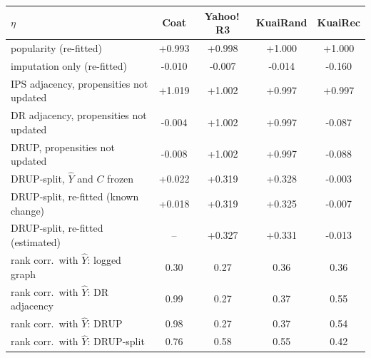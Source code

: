 \begin{tabular}{lcccc}
\toprule
$\eta$ & Coat & Yahoo!\,R3 & KuaiRand & KuaiRec\\
\midrule
popularity (re-fitted) & +0.993 & +0.998 & +1.000 & +1.000\\
imputation only (re-fitted) & -0.010 & -0.007 & -0.014 & -0.160\\
IPS adjacency, propensities not updated & +1.019 & +1.002 & +0.997 & +0.997\\
DR adjacency, propensities not updated & -0.004 & +1.002 & +0.997 & -0.087\\
DRUP, propensities not updated & -0.008 & +1.002 & +0.997 & -0.088\\
DRUP-split, $\hat Y$ and $C$ frozen & +0.022 & +0.319 & +0.328 & -0.003\\
DRUP-split, re-fitted (known change) & +0.018 & +0.319 & +0.325 & -0.007\\
DRUP-split, re-fitted (estimated) & -- & +0.327 & +0.331 & -0.013\\
\midrule
rank corr.\ with $\hat Y$: logged graph & 0.30 & 0.27 & 0.36 & 0.36\\
rank corr.\ with $\hat Y$: DR adjacency & 0.99 & 0.27 & 0.37 & 0.55\\
rank corr.\ with $\hat Y$: DRUP & 0.98 & 0.27 & 0.37 & 0.54\\
rank corr.\ with $\hat Y$: DRUP-split & 0.76 & 0.58 & 0.55 & 0.42\\
\bottomrule
\end{tabular}
